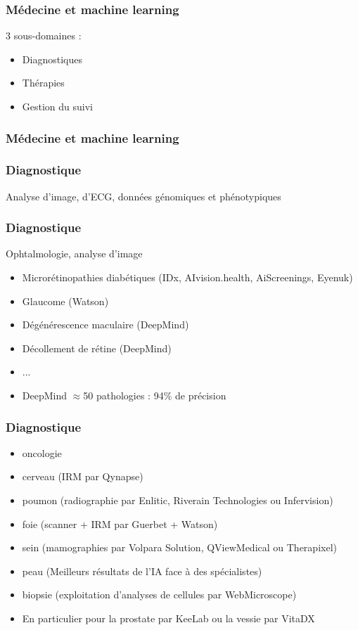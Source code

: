 \begin{frame}
  \frametitle{Médecine et machine learning}
  3 sous-domaines :
  \begin{itemize}
  \item Diagnostiques
  \item Thérapies
  \item Gestion du suivi
  \end{itemize}
\end{frame}

\begin{frame}
  \frametitle{Médecine et machine learning}
\end{frame}

\begin{frame}
  \frametitle{Diagnostique}
  Analyse d'image, d'ECG, données génomiques et phénotypiques
\end{frame}

\begin{frame}
  \frametitle{Diagnostique}
  Ophtalmologie, analyse d'image
  \newline
  \newline
  \begin{minipage}[c]{0.65\linewidth}
    \begin{itemize}
    \item Microrétinopathies diabétiques (IDx, AIvision.health, AiScreenings, Eyenuk)
    \item Glaucome (Watson)
    \item Dégénérescence maculaire (DeepMind)
    \item Décollement de rétine (DeepMind)
    \item ...
    \item DeepMind $\approx$50 pathologies : 94\% de précision
    \end{itemize}
  \end{minipage}\hfill
  \begin{minipage}[c]{0.34\linewidth}
  \end{minipage}\hfill
\end{frame}

\begin{frame}
  \frametitle{Diagnostique}
  \begin{itemize}
  \item oncologie
  \item cerveau (IRM par Qynapse)
  \item poumon (radiographie par Enlitic, Riverain Technologies ou Infervision)
  \item foie (scanner + IRM par Guerbet + Watson)
  \item sein (mamographies par Volpara Solution, QViewMedical ou Therapixel)
  \item peau (Meilleurs résultats de l'IA face à des spécialistes)
  \item biopsie (exploitation d'analyses de cellules par WebMicroscope)
  \item En particulier pour la prostate par KeeLab ou la vessie par VitaDX
  \end{itemize}
\end{frame}

